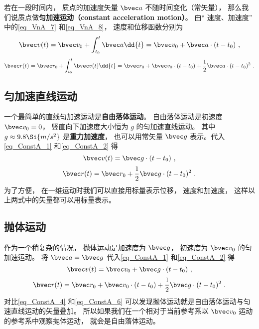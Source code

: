 
\begin{issues}
\issueTODO
\end{issues}

若在一段时间内， 质点的加速度矢量 $\bvec a$ 不随时间变化（常矢量）， 那么我们说质点做\textbf{匀加速运动（constant acceleration motion）}。 由“ 速度、加速度” 中的\autoref{eq_VnA_7} 和\autoref{eq_VnA_8}， 速度和位移函数分别为
\begin{equation}\label{eq_ConstA_1}
\bvec v(t) = \bvec v_0 + \int_{t_0}^{t} \bvec a \dd{t} = \bvec v_0 + \bvec a \cdot (t-t_0)~,
\end{equation}
\begin{equation}\label{eq_ConstA_2}
\bvec r(t) = \bvec r_0 + \int_{t_0}^{t} \bvec v(t) \dd{t} = \bvec r_0 + \bvec v_0\cdot (t-t_0) + \frac12 \bvec a\cdot (t-t_0)^2~.
\end{equation}


\subsection{匀加速直线运动}
一个最简单的直线匀加速运动是\textbf{自由落体运动}。 自由落体运动是初速度 $\bvec v_0 = 0$， 竖直向下加速度大小恒为 $g$ 的匀加速直线运动。 其中 $g\approx 9.8\Si{m/s^2}$ 是\textbf{重力加速度}， 也可以用常矢量 $\bvec g$ 表示。代入\autoref{eq_ConstA_1} 和\autoref{eq_ConstA_2} 得
\begin{equation}\label{eq_ConstA_3}
\bvec v(t) = \bvec g \cdot (t-t_0)~,
\end{equation}
\begin{equation}\label{eq_ConstA_4}
\bvec r(t) = \bvec r_0 + \frac12 \bvec g \cdot (t-t_0)^2~.
\end{equation}
为了方便， 在一维运动时我们可以直接用标量表示位移， 速度和加速度， 这样以上两式中的矢量都可以用标量表示。

\subsection{抛体运动}
作为一个稍复杂的情况， 抛体运动是加速度为 $\bvec g$， 初速度为 $\bvec v_0$ 的匀加速运动。 将 $\bvec a = \bvec g$ 代入\autoref{eq_ConstA_1} 和\autoref{eq_ConstA_2} 得
\begin{equation}\label{eq_ConstA_5}
\bvec v(t) = \bvec v_0 + \bvec g \cdot (t-t_0)~,
\end{equation}
\begin{equation}\label{eq_ConstA_6}
\bvec r(t) = \bvec r_0 + \bvec v_0\cdot (t-t_0) + \frac12 \bvec g\cdot (t-t_0)^2~.
\end{equation}
对比\autoref{eq_ConstA_4} 和\autoref{eq_ConstA_6} 可以发现抛体运动就是自由落体运动与匀速直线运动的矢量叠加。 所以如果我们在一个相对于当前参考系以 $\bvec v_0$ 运动的参考系中观察抛体运动， 就会是自由落体运动。
